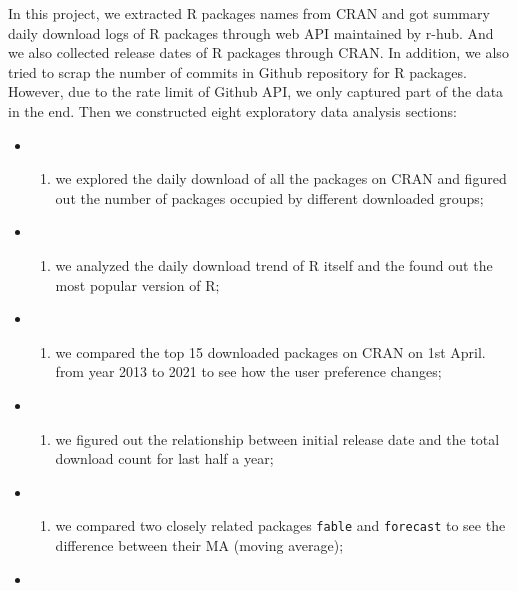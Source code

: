 \documentclass[
]{book}
\providecommand{\tightlist}{%
  \setlength{\itemsep}{0pt}\setlength{\parskip}{0pt}}
\begin{document}
In this project, we extracted R packages names from CRAN and got summary daily download logs of R packages through web API maintained by r-hub\citep{rhub}. And we also collected release dates of R packages through CRAN. In addition, we also tried to scrap the number of commits in Github repository for R packages. However, due to the rate limit of Github API, we only captured part of the data in the end. Then we constructed eight exploratory data analysis sections:

\begin{itemize}
\item
  \begin{enumerate}
  \def\labelenumi{\alph{enumi})}
  \tightlist
  \item
    we explored the daily download of all the packages on CRAN and figured out the number of packages occupied by different downloaded groups;
  \end{enumerate}
\item
  \begin{enumerate}
  \def\labelenumi{\alph{enumi})}
  \setcounter{enumi}{1}
  \tightlist
  \item
    we analyzed the daily download trend of R itself and the found out the most popular version of R;
  \end{enumerate}
\item
  \begin{enumerate}
  \def\labelenumi{\alph{enumi})}
  \setcounter{enumi}{2}
  \tightlist
  \item
    we compared the top 15 downloaded packages on CRAN on 1st April. from year 2013 to 2021 to see how the user preference changes;
  \end{enumerate}
\item
  \begin{enumerate}
  \def\labelenumi{\alph{enumi})}
  \setcounter{enumi}{3}
  \tightlist
  \item
    we figured out the relationship between initial release date and the total download count for last half a year;
  \end{enumerate}
\item
  \begin{enumerate}
  \def\labelenumi{\alph{enumi})}
  \setcounter{enumi}{4}
  \tightlist
  \item
    we compared two closely related packages \texttt{fable} and \texttt{forecast} to see the difference between their MA (moving average);
  \end{enumerate}
\item

\end{itemize}
\end{document}
